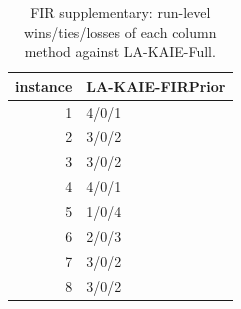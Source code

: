 \begin{table}[t]
\centering
\scriptsize
\caption{FIR supplementary: run-level wins/ties/losses of each column method against LA-KAIE-Full.}
\label{tab:fir_supplementary_wtl}
\begin{tabular}{rl}
\toprule
instance & LA-KAIE-FIRPrior \\
\midrule
1 & 4/0/1 \\
2 & 3/0/2 \\
3 & 3/0/2 \\
4 & 4/0/1 \\
5 & 1/0/4 \\
6 & 2/0/3 \\
7 & 3/0/2 \\
8 & 3/0/2 \\
\bottomrule
\end{tabular}
\end{table}
